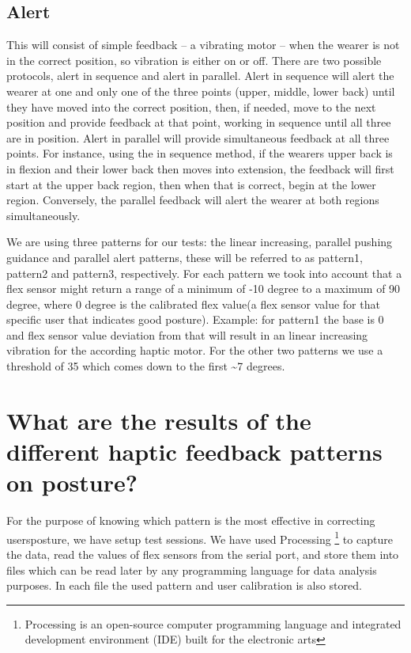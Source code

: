 \documentclass[sigconf]{acmart}
\begin{document}
\subsection{Alert}
This will consist of simple feedback – a vibrating motor – when the wearer is not in the correct position, so vibration is either on or off. There are two possible protocols, alert in sequence and alert in parallel. Alert in sequence will alert the wearer at one and only one of the three points (upper, middle, lower back) until they have moved into the correct position, then, if needed, move to the next position and provide feedback at that point, working in sequence until all three are in position. Alert in parallel will provide simultaneous feedback at all three points. For instance, using the in sequence method, if the wearer\textquotesingle s upper back is in flexion and their lower back then moves into extension, the feedback will first start at the upper back region, then when that is correct, begin at the lower region. Conversely, the parallel feedback will alert the wearer at both regions simultaneously. 



We are using three patterns for our tests: the linear increasing, parallel pushing guidance and parallel alert patterns, these will be referred to as pattern1, pattern2 and pattern3, respectively. For each pattern we took into account that a flex sensor might return a range of a minimum of {-}10 degree to a maximum of 90 degree, where 0 degree is the calibrated flex value(a flex sensor value for that specific user that indicates good posture). 
Example: for pattern1 the base is 0 and flex sensor value deviation from that will result in an linear increasing vibration for the according haptic motor. For the other two patterns we use a threshold of 35 which comes down to the first \textasciitilde 7 degrees.


\section{What are the results of the different haptic feedback patterns on posture?}
For the purpose of knowing which pattern is the most effective in correcting users\textquotesingle posture, we have setup test sessions. 
We have used Processing \footnote{Processing is an open{-}source computer programming language and integrated development environment (IDE) built for the electronic arts}  to capture the data, read the values of flex sensors from the serial port, and store them into files which can be read later by any programming language for data analysis purposes. In each file the used pattern and user calibration is also stored.
\end{document}
